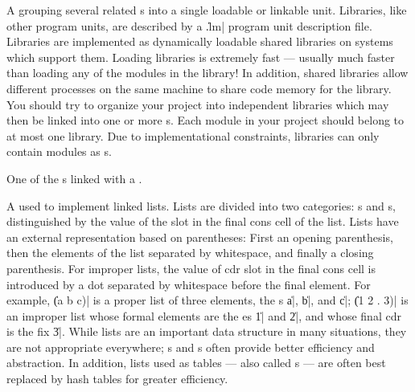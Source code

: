 \begin{description}
	{A  grouping several related s
	into a single loadable or linkable unit.  Libraries, like
	other program units, are described by a \|.lm| program unit
	description file.  Libraries are implemented as dynamically
	loadable shared libraries on systems which support them.
	Loading libraries is extremely fast --- usually much faster
	than loading any of the modules in the library! In addition,
	shared libraries allow different processes on the same machine
	to share code memory for the library.  You should try to
	organize your project into independent libraries which may
	then be linked into one or more s.  Each
	module in your project should belong to at most one library.
	Due to implementational constraints, libraries can only
	contain modules as s.}

	{One of the s linked with a .}

	{A  used to implement linked lists.  Lists are
	divided into two categories: s and
	s, distinguished by the value of the
	 slot in the final cons cell of the list.  Lists
	have an external representation based on parentheses: First an
	opening parenthesis, then the elements of the list separated
	by whitespace, and finally a closing parenthesis.  For
	improper lists, the value of cdr slot in the final cons cell
	is introduced by a dot separated by whitespace before the
	final element.  For example, \|(a b c)| is a proper list of
	three elements, the s \|a|, \|b|, and \|c|; \|(1
	2 . 3)| is an improper list whose formal elements are the
	es \|1| and \|2|, and whose final cdr is the fix
	\|3|.  While lists are an important data structure in many
	situations, they are not appropriate everywhere;
	s and s often provide better
	efficiency and abstraction.  In addition, lists used as
	tables --- also called s --- are often
	best replaced by hash tables for greater efficiency.}


\end{description}
